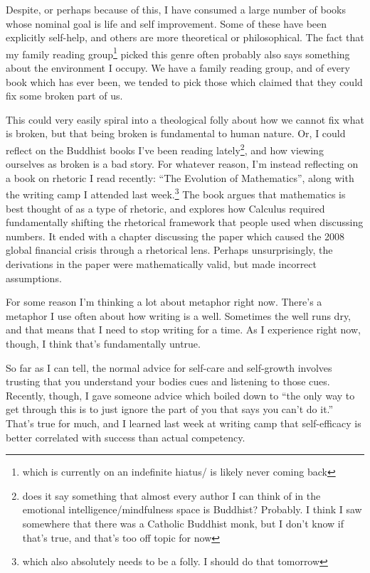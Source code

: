 \documentclass[12pt]{article}
\newcommand{\say}[1]{``#1''}
\renewcommand{\,}{\textsuperscript{,}}
\begin{document}
Despite, or perhaps because of this, I have consumed a large number of books whose nominal goal is life and self improvement.  
Some of these have been explicitly self-help, and others are more theoretical or philosophical.  
The fact that my family reading group\footnote{which is currently on an indefinite hiatus/ is likely never coming back} picked this genre often probably also says something about the environment I occupy.  
We have a family reading group, and of every book which has ever been, we tended to pick those which claimed that they could fix some broken part of us.

This could very easily spiral into a theological folly about how we cannot fix what is broken, but that being broken is fundamental to human nature.  
Or, I could reflect on the Buddhist books I've been reading lately\footnote{does it say something that almost every author I can think of in the emotional intelligence/mindfulness space is Buddhist? Probably. I think I saw somewhere that there was a Catholic Buddhist monk, but I don't know if that's true, and that's too off topic for now}, and how viewing ourselves as broken is a bad story.  
For whatever reason, I'm instead reflecting on a book on rhetoric I read recently: \say{The Evolution of Mathematics}, along with the writing camp I attended last week.\footnote{which also absolutely needs to be a folly. I should do that tomorrow}  
The book argues that mathematics is best thought of as a type of rhetoric, and explores how Calculus required fundamentally shifting the rhetorical framework that people used when discussing numbers.  
It ended with a chapter discussing the paper which caused the 2008 global financial crisis through a rhetorical lens.  
Perhaps unsurprisingly, the derivations in the paper were mathematically valid, but made incorrect assumptions.

For some reason I'm thinking a lot about metaphor right now.  
There's a metaphor I use often about how writing is a well.  
Sometimes the well runs dry, and that means that I need to stop writing for a time.  
As I experience right now, though, I think that's fundamentally untrue.

So far as I can tell, the normal advice for self-care and self-growth involves trusting that you understand your bodies cues and listening to those cues.  
Recently, though, I gave someone advice which boiled down to \say{the only way to get through this is to just ignore the part of you that says you can't do it.}  
That's true for much, and I learned last week at writing camp that self-efficacy is better correlated with success than actual competency.
\end{document}
